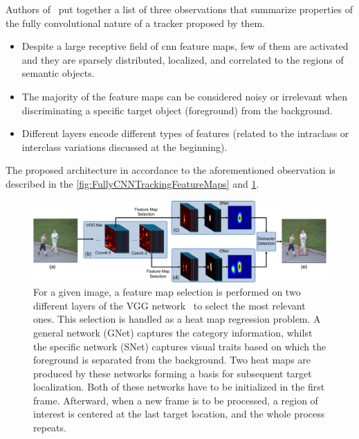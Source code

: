 Authors of~\cite{Wang2015} put together a list of three observations that summarize properties of the fully convolutional nature of a tracker proposed by them.

\begin{itemize}
    \item Despite a large receptive field of \gls{cnn} feature maps, few of them are activated and they are sparsely distributed, localized, and correlated to the regions of semantic objects.
    \item The majority of the feature maps can be considered noisy or irrelevant when discriminating a specific target object (foreground) from the background.
    \item Different layers encode different types of features (related to the intraclass or interclass variations discussed at the beginning).
\end{itemize}

\noindent The proposed architecture in accordance to the aforementioned observation is described in the \cref{fig:FullyCNNTrackingFeatureMaps} and \cref{fig:FullyCNNTrackingSNetGNet}.

\begin{figure}[t]
    \centerline{\includegraphics[width=\linewidth]{figures/theoretical_foundations/fully_cnn_tracking_snet_gnet.pdf}}
    \caption[Architecture of fully convolutional tracking]{For a given image, a feature map selection is performed on two different layers of the VGG network~\cite{Simonyan2015} to select the most relevant ones. This selection is handled as a heat map regression problem. A general network (GNet) captures the category information, whilst the specific network (SNet) captures visual traits based on which the foreground is separated from the background. Two heat maps are produced by these networks forming a basis for subsequent target localization. Both of these networks have to be initialized in the first frame. Afterward, when a new frame is to be processed, a region of interest is centered at the last target location, and the whole process repeats. }
    \label{fig:FullyCNNTrackingSNetGNet}
\end{figure}

